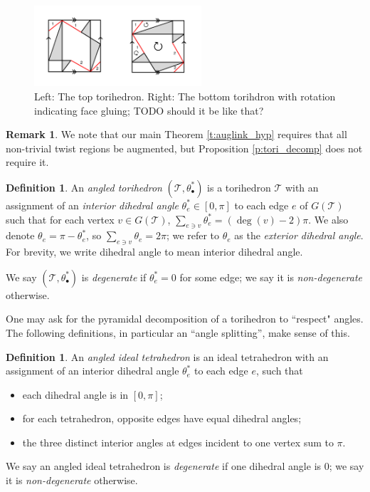 \documentclass[11pt]{amsart}
\newcommand{\thmref}[1]{Theorem \ref{#1}}
\newcommand{\prpref}[1]{Proposition \ref{#1}}
\newcommand{\sT}{{\mathcal{T}}}
\theoremstyle{plain}
\theoremstyle{definition}
\newtheorem{define}[theorem]{Definition}
\newtheorem{definition}[theorem]{Definition}
\newtheorem{remark}[theorem]{Remark}
\begin{document}
\begin{figure}[h] 
\centering 
\includegraphics[height=3cm]{top-bottom-flippedarrows.png} 
	\caption{Left: The top torihedron.
	Right: The bottom torihdron with rotation indicating face gluing;
	TODO should it be like that?} 
\label{fig:top-bottom-flippedarrows}
\end{figure}


\begin{remark}
We note that our main \thmref{t:auglink_hyp}
requires that all non-trivial twist regions be augmented,
but \prpref{p:tori_decomp} does not require it.
\label{r:unnecessary-augment-bigon}
\end{remark}


\begin{definition}
An \emph{angled torihedron} $(\sT, \theta_\bullet^*)$
is a torihedron $\sT$ with
an assignment of an \emph{interior dihedral angle}
$\theta_e^* \in [0,\pi]$ to each edge $e$ of $G(\sT)$
such that for each vertex $v \in G(\sT)$,
$\sum_{e \ni v} \theta_e^* = (\deg(v) - 2)\pi$.
We also denote $\theta_e = \pi - \theta_e^*$,
so $\sum_{e \ni v} \theta_e = 2\pi$;
we refer to $\theta_e$ as the \emph{exterior dihedral angle}.
For brevity, we write dihedral angle to mean 
interior dihedral angle.  


We say $(\sT, \theta_\bullet^*)$ is \emph{degenerate}
if $\theta_e^* = 0$ for some edge;
we say it is \emph{non-degenerate} otherwise.
\end{definition}


One may ask for the pyramidal decomposition of a torihedron
to ``respect" angles. The following definitions,
in particular an ``angle splitting'', make sense of this.

\begin{define}
An \emph{angled ideal tetrahedron} is an ideal tetrahedron
with an assignment of an
interior dihedral angle $\theta_e^*$ to each edge $e$, such that
\begin{itemize}
\item each dihedral angle is in $[0, \pi]$;
\item for each tetrahedron, opposite edges have equal dihedral angles;
\item the three distinct interior angles at edges incident to one vertex sum to $\pi$.
\end{itemize}

We say an angled ideal tetrahedron is \emph{degenerate} if
one dihedral angle is 0; we say it is \emph{non-degenerate} otherwise.
\end{define}
\end{document}
